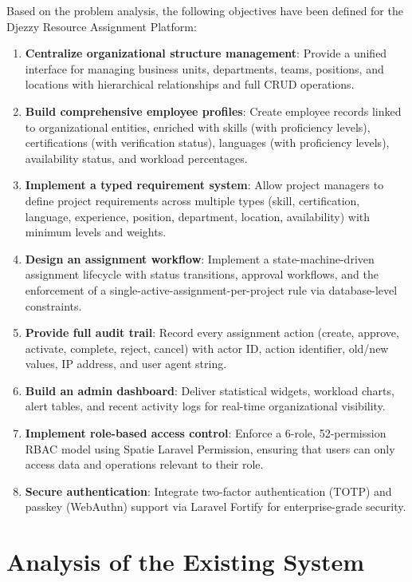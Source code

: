 \documentclass{bts-report}
\begin{document}
Based on the problem analysis, the following objectives have been defined for the Djezzy Resource Assignment Platform:

\begin{enumerate}
  \item \textbf{Centralize organizational structure management}: Provide a unified interface for managing business units, departments, teams, positions, and locations with hierarchical relationships and full CRUD operations.
  \item \textbf{Build comprehensive employee profiles}: Create employee records linked to organizational entities, enriched with skills (with proficiency levels), certifications (with verification status), languages (with proficiency levels), availability status, and workload percentages.
  \item \textbf{Implement a typed requirement system}: Allow project managers to define project requirements across multiple types (skill, certification, language, experience, position, department, location, availability) with minimum levels and weights.
  \item \textbf{Design an assignment workflow}: Implement a state-machine-driven assignment lifecycle with status transitions, approval workflows, and the enforcement of a single-active-assignment-per-project rule via database-level constraints.
  \item \textbf{Provide full audit trail}: Record every assignment action (create, approve, activate, complete, reject, cancel) with actor ID, action identifier, old/new values, IP address, and user agent string.
  \item \textbf{Build an admin dashboard}: Deliver statistical widgets, workload charts, alert tables, and recent activity logs for real-time organizational visibility.
  \item \textbf{Implement role-based access control}: Enforce a 6-role, 52-permission RBAC model using Spatie Laravel Permission, ensuring that users can only access data and operations relevant to their role.
  \item \textbf{Secure authentication}: Integrate two-factor authentication (TOTP) and passkey (WebAuthn) support via Laravel Fortify for enterprise-grade security.
\end{enumerate}

\section{Analysis of the Existing System}
\end{document}
